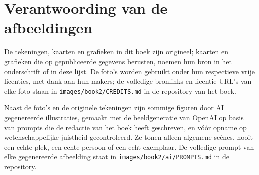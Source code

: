 \chapter*{Verantwoording van de afbeeldingen}

De tekeningen, kaarten en grafieken in dit boek zijn origineel; kaarten en
grafieken die op gepubliceerde gegevens berusten, noemen hun bron in het
onderschrift of in deze lijst. De foto's worden gebruikt onder hun
respectieve vrije licenties, met dank aan hun makers; de volledige
bronlinks en licentie-URL's van elke foto staan in
\texttt{images/book2/CREDITS.md} in de repository van het boek.

\bigskip
Naast de foto's en de originele tekeningen zijn sommige figuren door AI
gegenereerde illustraties, gemaakt met de beeldgeneratie van OpenAI op
basis van prompts die de redactie van het boek heeft geschreven, en vóór
opname op wetenschappelijke juistheid gecontroleerd. Ze tonen alleen
algemene scènes, nooit een echte plek, een echte persoon of een echt
exemplaar. De volledige prompt van elke gegenereerde afbeelding staat in
\texttt{images/book2/ai/PROMPTS.md} in de repository.

